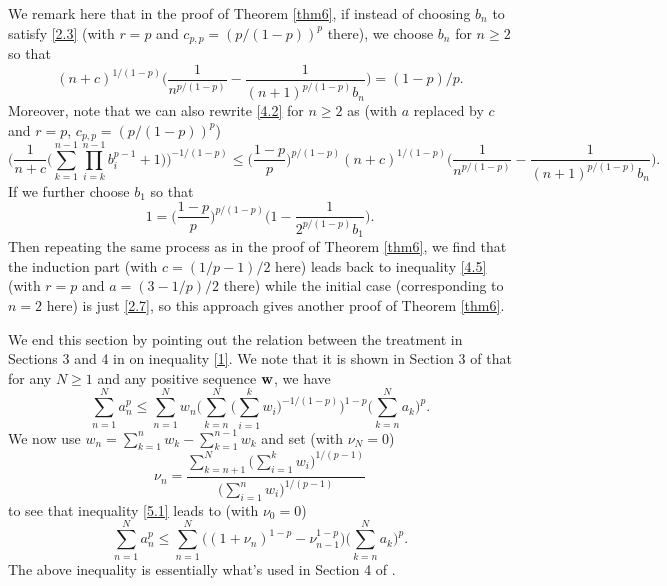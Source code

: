 \documentclass[11pt]{amsart}
\numberwithin{equation}{section}
\theoremstyle{definition}
\theoremstyle{remark}
\begin{document}
   We remark here that in the proof of Theorem \ref{thm6}, if instead of choosing $b_n$ to satisfy
   \eqref{2.3} (with $r=p$ and $c_{p,p}=(p/(1-p))^p$ there), we
   choose $b_n$ for $n \geq 2$ so that
\begin{equation*}
   (n+c)^{1/(1-p)}
 \Big( \frac {1}{n^{p/(1-p)}}- \frac
 {1}{(n+1)^{p/(1-p)}b_n}\Big)=(1-p)/p.
\end{equation*}
    Moreover, note that we can also rewrite \eqref{4.2} for $n \geq 2$ as (with
    $a$ replaced by $c$ and $r=p$, $c_{p,p}=(p/(1-p))^p$)
\begin{equation*}
 \Big(\frac {1}{n+c}\Big( \sum^{n-1}_{k=1}\prod^{n-1}_{i=k}b^{p-1}_i+1 \Big )\Big )^{-1/(1-p)} \leq
 \Big (\frac {1-p}{p} \Big )^{p/(1-p)}(n+c)^{1/(1-p)}
 \Big( \frac {1}{n^{p/(1-p)}}- \frac
 {1}{(n+1)^{p/(1-p)}b_n}\Big).
\end{equation*}
  If we further choose $b_1$ so that
\begin{equation*}
 1=\Big (\frac {1-p}{p} \Big )^{p/(1-p)}
 \Big( 1- \frac
 {1}{2^{p/(1-p)}b_1}\Big).
\end{equation*}
   Then repeating the same process as in the proof of Theorem
   \ref{thm6}, we find that the induction part (with $c=(1/p-1)/2$ here)
   leads back to inequality \eqref{4.5} (with $r=p$ and $a=(3-1/p)/2$ there) while the initial
   case (corresponding to
   $n=2$ here) is just \eqref{2.7}, so this approach gives another
   proof of Theorem \ref{thm6}.

   We end this section by pointing out the relation between the treatment in
   Sections
   3 and 4 in \cite{G6} on inequality \eqref{1}. We note that it is shown in Section 3 of \cite{G6}
   that for any $N \geq 1$ and any positive sequence ${\bf w}$, we
   have
\begin{equation}
\label{5.1}
   \sum^{N}_{n=1}a^p_n \leq \sum^{N}_{n=1}w_n\Big ( \sum^{N}_{k=n}\Big(\sum^k_{i=1}w_i \Big)^{-1/(1-p)}\Big
  )^{1-p} \Big ( \sum^{N}_{k=n}a_k\Big
  )^{p}.
\end{equation}
    We now use $w_n=\sum^n_{k=1}w_k-\sum^{n-1}_{k=1}w_k$ and set
    (with $\nu_{N}=0$)
\begin{equation*}
     \nu_n=\frac {\sum^{N}_{k=n+1}\Big(\sum^k_{i=1}w_i
    \Big)^{1/(p-1)}}{\Big(\sum^n_{i=1}w_i
    \Big)^{1/(p-1)}}
\end{equation*}
    to see that inequality \eqref{5.1} leads to (with $\nu_0=0$)
\begin{equation*}
   \sum^{N}_{n=1}a^p_n \leq \sum_{n=1}^{N}\Big ( (1+\nu_n)^{1-p}-
   \nu^{1-p}_{n-1} \Big )\Big ( \sum^{N}_{k=n}a_k\Big
  )^{p}.
\end{equation*}
   The above inequality is essentially what's used in Section 4 of
   \cite{G6}.
\end{document}
